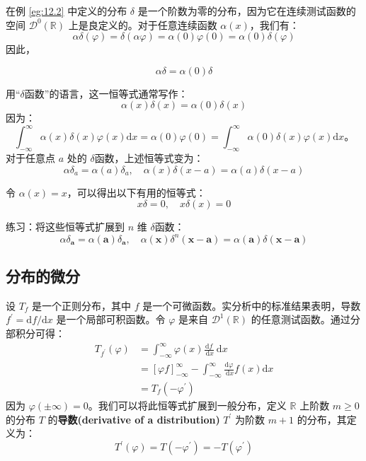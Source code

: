 \begin{eg}\label{eg:12.3}
在例 \ref{eg:12.2} 中定义的分布 $\delta$
是一个阶数为零的分布，因为它在连续测试函数的空间
$\mathcal{D}^0(\mathbb{R})$ 上是良定义的。对于任意连续函数
$\alpha(x)$，我们有：
 $$
\alpha \delta(\varphi) = \delta(\alpha \varphi) = \alpha(0) \varphi(0) = \alpha(0) \delta(\varphi)
$$
因此，

\begin{equation}
  \alpha \delta = \alpha(0) \delta
\end{equation}

用``$\delta$函数''的语言，这一恒等式通常写作：
 $$
\alpha(x) \delta(x) = \alpha(0) \delta(x)
$$
因为：
 $$
\int_{-\infty}^\infty \alpha(x) \delta(x) \varphi(x) \mathrm{d}x = \alpha(0) \varphi(0) = \int_{-\infty}^\infty \alpha(0) \delta(x) \varphi(x) \mathrm{d}x。
$$
对于任意点 $a$ 处的 $\delta$函数，上述恒等式变为：
\begin{equation}
  \alpha \delta_a = \alpha(a) \delta_a, \quad \alpha(x) \delta(x-a) = \alpha(a) \delta(x-a)
\end{equation}


令 $\alpha(x) = x$，可以得出以下有用的恒等式：
\begin{equation}
  x \delta = 0, \quad x \delta(x) = 0
\end{equation}

\end{eg}
\begin{exercise}
  练习：将这些恒等式扩展到 $n$ 维 $\delta$函数：
 $$
\alpha \delta_{\mathbf{a}} = \alpha(\mathbf{a}) \delta_{\mathbf{a}}, \quad \alpha(\mathbf{x}) \delta^n(\mathbf{x} - \mathbf{a}) = \alpha(\mathbf{a}) \delta(\mathbf{x} - \mathbf{a})
$$
\end{exercise}

\subsection{分布的微分}

设 $T_f$ 是一个正则分布，其中 $f$
是一个可微函数。实分析中的标准结果表明，导数
$f^{\prime} = \mathrm{d}f / \mathrm{d}x$ 是一个局部可积函数。令
$\varphi$ 是来自 $\mathcal{D}^1(\mathbb{R})$
的任意测试函数。通过分部积分可得：
 $$
\begin{aligned}
T_{f^{\prime}}(\varphi) & = \int_{-\infty}^\infty \varphi(x) \frac{\mathrm{d}f}{\mathrm{~d}x} \mathrm{~d}x \\
& = [\varphi f]_{-\infty}^\infty - \int_{-\infty}^\infty \frac{\mathrm{d}\varphi}{\mathrm{~d}x} f(x) \mathrm{d}x \\
& = T_f\left(-\varphi^{\prime}\right)
\end{aligned}
$$
因为 $\varphi(\pm \infty) = 0$。我们可以将此恒等式扩展到一般分布，定义
$\mathbb{R}$ 上阶数 $m \geq 0$ 的分布 $T$ 的\textbf{导数(derivative of a distribution)}
$T^{\prime}$ 为阶数 $m+1$ 的分布，其定义为：
\begin{equation}
  T^{\prime}(\varphi) = T\left(-\varphi^{\prime}\right) = -T\left(\varphi^{\prime}\right)
\end{equation}


